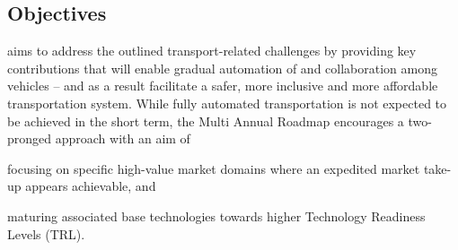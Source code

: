 
\subsection{Objectives}
\label{sec:objectives}

\Project{} aims to address the outlined transport-related challenges by providing key contributions that will enable gradual automation of and collaboration among vehicles -- and as a result facilitate a safer, more inclusive and more affordable transportation system. While fully automated transportation is not expected to be achieved in the short term, the Multi Annual Roadmap encourages a two-pronged approach with an aim of

\begin{denseItemize}
	\item focusing on specific high-value market domains where an expedited market take-up appears achievable, and 
	\item maturing associated base technologies towards higher Technology Readiness Levels (TRL).
\end{denseItemize}
	


